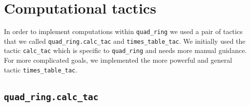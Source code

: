 \documentclass[sigplan,10pt,nonacm,
screen]{acmart} \settopmatter{printfolios=true,printccs=false,printacmref=false}
\begin{document}





\section{Computational tactics} \label{sec:computational-tactics}

In order to implement computations within \lstinline{quad_ring} we used a pair of tactics
that we called \lstinline{quad_ring.calc_tac} and \lstinline{times_table_tac}.
We initially used the tactic \lstinline{calc_tac} which is specific to \lstinline{quad_ring} and needs more manual guidance.
For more complicated goals, we implemented the more powerful and general tactic \lstinline{times_table_tac}.

\subsection{\lstinline{quad_ring.calc_tac}}
\end{document}
